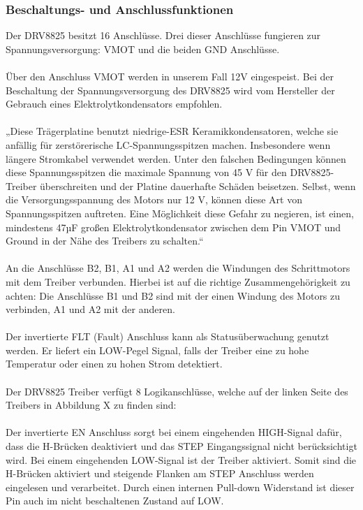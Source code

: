 \subsubsection{Beschaltungs- und Anschlussfunktionen}
Der DRV8825 besitzt 16 Anschlüsse. Drei dieser Anschlüsse fungieren zur Spannungsversorgung: VMOT und die beiden GND Anschlüsse. \\\\
Über den Anschluss VMOT werden in unserem Fall 12V eingespeist. Bei der Beschaltung der Spannungsversorgung des DRV8825 wird vom Hersteller der Gebrauch eines Elektrolytkondensators empfohlen. \\\\
„Diese Trägerplatine benutzt niedrige-ESR Keramikkondensatoren, welche sie anfällig für zerstörerische LC-Spannungsspitzen machen. Insbesondere wenn längere Stromkabel verwendet werden.
Unter den falschen Bedingungen können diese Spannungsspitzen die maximale Spannung von 45 V für den DRV8825-Treiber überschreiten und der Platine dauerhafte Schäden beisetzen.
Selbst, wenn die Versorgungsspannung des Motors nur 12 V, können diese Art von Spannungsspitzen auftreten.
Eine Möglichkeit diese Gefahr zu negieren, ist einen, mindestens 47µF großen Elektrolytkondensator zwischen dem Pin VMOT und Ground in der Nähe des Treibers zu schalten.“ \\\\
An die Anschlüsse B2, B1, A1 und A2 werden die Windungen des Schrittmotors mit dem Treiber verbunden. Hierbei ist auf die richtige Zusammengehörigkeit zu achten:
Die Anschlüsse B1 und B2 sind mit der einen Windung des Motors zu verbinden, A1 und A2 mit der anderen. \\\\
Der invertierte FLT (Fault)  Anschluss kann als Statusüberwachung genutzt werden. Er liefert ein LOW-Pegel Signal, falls der Treiber eine zu hohe Temperatur oder einen zu hohen Strom detektiert. \\\\
Der DRV8825 Treiber verfügt 8 Logikanschlüsse, welche auf der linken Seite des Treibers in Abbildung X zu finden sind: \\\\
Der invertierte EN Anschluss sorgt bei einem eingehenden HIGH-Signal dafür, dass die H-Brücken deaktiviert und das STEP Eingangssignal nicht berücksichtigt wird. Bei einem eingehenden LOW-Signal ist der Treiber aktiviert.
Somit sind die H-Brücken aktiviert und steigende Flanken am STEP Anschluss werden eingelesen und verarbeitet.
Durch einen internen Pull-down Widerstand ist dieser Pin auch im nicht beschaltenen Zustand auf LOW. \\\\
